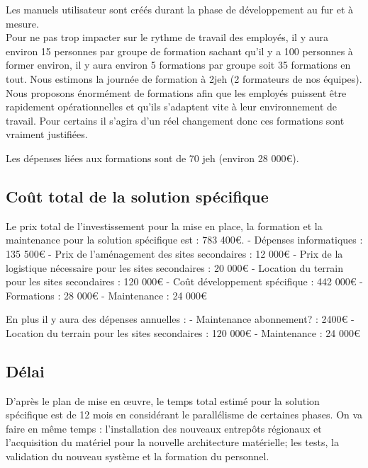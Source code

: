 \begin{description}
\begin{enumerate}
Les manuels utilisateur sont créés durant la phase de développement au fur et à mesure.\\

Pour ne pas trop impacter sur le rythme de travail des employés, il y aura environ 15 personnes par groupe de formation sachant qu'il y a 100 personnes à former  environ, il y aura environ 5 formations par groupe soit 35 formations en tout.
Nous estimons la journée de formation à 2jeh (2 formateurs de nos équipes). Nous proposons énormément de formations afin que les employés puissent être rapidement opérationnelles et qu'ils s'adaptent vite à leur environnement de travail. Pour certains il s'agira d'un réel changement donc ces formations sont vraiment justifiées.

Les dépenses liées aux formations sont de 70 jeh (environ 28 000€).
 

\end{enumerate}

\subsection{Coût total de la solution spécifique}

Le prix total de l'investissement pour la mise en place, la formation et la maintenance pour la solution spécifique est : 783 400€.
      - Dépenses informatiques : 135 500€
      - Prix de l'aménagement des sites secondaires : 12 000€
      - Prix de la logistique nécessaire pour les sites secondaires : 20 000€
      - Location du terrain pour les sites secondaires : 120 000€
      - Coût développement spécifique : 442 000€
      - Formations : 28 000€
      - Maintenance : 24 000€

En plus il y aura des dépenses annuelles :
      - Maintenance abonnement? : 2400€
      - Location du terrain pour les sites secondaires : 120 000€
      - Maintenance : 24 000€

    \subsection{Délai}

          D'après le plan de mise en œuvre, le temps total estimé pour la solution spécifique est de 12 mois en considérant le parallélisme de certaines phases. On va faire en même temps : l'installation des nouveaux entrepôts régionaux et l'acquisition du matériel pour la nouvelle architecture matérielle; les tests, la validation du nouveau système et la formation du personnel.


\end{description}
